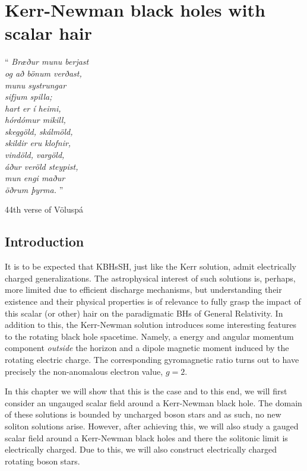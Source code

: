 \chapter{Kerr-Newman black holes with scalar hair}
\label{ch:KN}

\epigraph{``\emph{
Bræður munu berjast \\
og að bönum verðast, \\
munu systrungar \\
sifjum spilla; \\
hart er í heimi, \\
hórdómur mikill, \\
skeggöld, skálmöld, \\
skildir eru klofnir, \\
vindöld, vargöld, \\
áður veröld steypist, \\
mun engi maður \\
öðrum þyrma. 
} 
''}{44th verse of Völuspá}


\section{Introduction}

It is to be expected that KBHsSH, just like the Kerr solution, admit electrically charged generalizations.
The astrophysical interest of such solutions is, perhaps, more limited due to efficient discharge mechanisms, but understanding their existence and their physical properties is of relevance to fully grasp the impact of this scalar (or other) hair on the paradigmatic BHs of General Relativity.
In addition to this, the Kerr-Newman solution introduces some interesting features to the rotating black hole spacetime.
Namely, a energy and angular momentum component \emph{outside} the horizon and a dipole magnetic moment induced by the rotating electric charge.
The corresponding gyromagnetic ratio turns out to have precisely the non-anomalous electron value, $g=2$.

In this chapter we will show that this is the case and to this end, we will first consider an ungauged scalar field around a Kerr-Newman black hole.
The domain of these solutions is bounded by uncharged boson stars and as such, no new soliton solutions arise.
However, after achieving this, we will also study a gauged scalar field around a Kerr-Newman black holes and there the solitonic limit is electrically charged.
Due to this, we will also construct electrically charged rotating boson stars.

